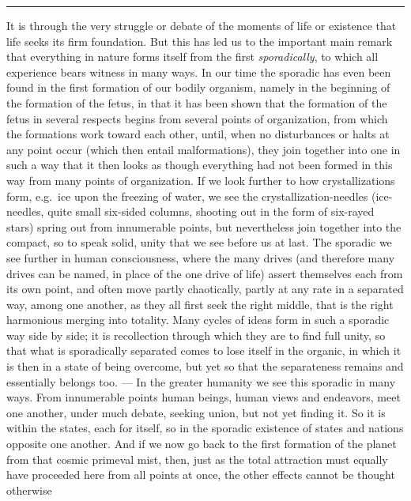 \documentclass[12pt,a4paper,openany]{book}
\newcommand{\opage}[1]{\marginnote{\footnotesize\textit{[#1]}}}
\newcommand{\sectionrule}{\par\begin{center}\rule{4em}{0.4pt}\end{center}}
\begin{document}
\sectionrule

It is through the very struggle or debate of the moments of life or existence that
life seeks its firm foundation. But
\setcounter{footnote}{0}%
\opage{128}this has led us to the important main remark that everything in nature forms
itself from the first \emph{sporadically}, to which all experience bears witness in
many ways. In our time the sporadic has even been found in the first formation of our
bodily organism, namely in the beginning of the formation of the fetus, in that it
has been shown that the formation of the fetus in several respects begins from
several points of organization, from which the formations work toward each other,
until, when no disturbances or halts at any point occur (which then entail
malformations), they join together into one in such a way that it then looks as
though everything had not been formed in this way from many points of organization.
If we look further to how crystallizations form, e.g.\ ice upon the freezing of
water, we see the crystallization-needles (ice-needles, quite small six-sided
columns, shooting out in the form of six-rayed stars) spring out from innumerable
points, but nevertheless join together into the compact, so to speak solid, unity
that we see before us at last. The sporadic we see further in human consciousness,
where the many drives (and therefore many drives can be named, in place of the one
drive of life) assert themselves each from its own point, and often move partly
chaotically, partly at any rate in a separated way, among one another, as they all
first seek the right middle, that is the right harmonious merging into totality.
Many cycles of ideas form in such a sporadic way side by side; it is recollection
through which they are to find full unity, so that what is sporadically separated
comes to lose itself in the organic, in which it is then in a state of being
overcome, but yet so that the separateness remains and essentially belongs too.
--- In the greater humanity we see this sporadic in many ways. From innumerable
points human beings, human views and endeavors, meet one another, under much debate,
seeking union, but not yet finding it. So it is within the states, each for itself,
so in the sporadic existence of states and nations
\setcounter{footnote}{0}%
\opage{129}opposite one another. And if we now go back to the first formation of the planet
from that cosmic primeval mist, then, just as the total attraction must equally have
proceeded here from all points at once, the other effects cannot be thought otherwise
\end{document}
